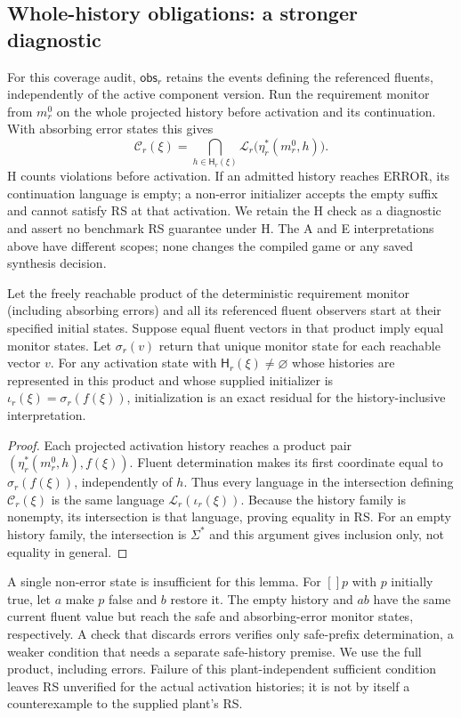 \subsection{Whole-history obligations: a stronger diagnostic}\label{supp:history-diagnostic}
For this coverage audit, $\mathsf{obs}_r$ retains the events defining the referenced fluents, independently of the active component version. Run the requirement monitor from $m_r^0$ on the whole projected history before activation and its continuation. With absorbing error states this gives
\[
 \mathcal C_r(\xi)=\bigcap_{h\in\mathsf H_r(\xi)}
 \mathcal L_r\bigl(\eta_r^*(m_r^0,h)\bigr).
\]
H counts violations before activation. If an admitted history reaches ERROR, its continuation language is empty; a non-error initializer accepts the empty suffix and cannot satisfy RS at that activation. We retain the H check as a diagnostic and assert no benchmark RS guarantee under H. The A and E interpretations above have different scopes; none changes the compiled game or any saved synthesis decision.

\begin{lemma}
\label{lem:fluent-determined}
Let the freely reachable product of the deterministic requirement monitor (including absorbing errors) and all its referenced fluent observers start at their specified initial states. Suppose equal fluent vectors in that product imply equal monitor states. Let $\sigma_r(v)$ return that unique monitor state for each reachable vector $v$. For any activation state with $\mathsf H_r(\xi)\ne\varnothing$ whose histories are represented in this product and whose supplied initializer is $\iota_r(\xi)=\sigma_r(f(\xi))$, initialization is an exact residual for the history-inclusive interpretation.
\end{lemma}
\begin{proof}
Each projected activation history reaches a product pair $(\eta_r^*(m_r^0,h),f(\xi))$. Fluent determination makes its first coordinate equal to $\sigma_r(f(\xi))$, independently of $h$. Thus every language in the intersection defining $\mathcal C_r(\xi)$ is the same language $\mathcal L_r(\iota_r(\xi))$. Because the history family is nonempty, its intersection is that language, proving equality in RS. For an empty history family, the intersection is $\Sigma^*$ and this argument gives inclusion only, not equality in general.
\end{proof}

A single non-error state is insufficient for this lemma. For $[]p$ with $p$ initially true, let $a$ make $p$ false and $b$ restore it. The empty history and $ab$ have the same current fluent value but reach the safe and absorbing-error monitor states, respectively. A check that discards errors verifies only safe-prefix determination, a weaker condition that needs a separate safe-history premise. We use the full product, including errors. Failure of this plant-independent sufficient condition leaves RS unverified for the actual activation histories; it is not by itself a counterexample to the supplied plant's RS.

